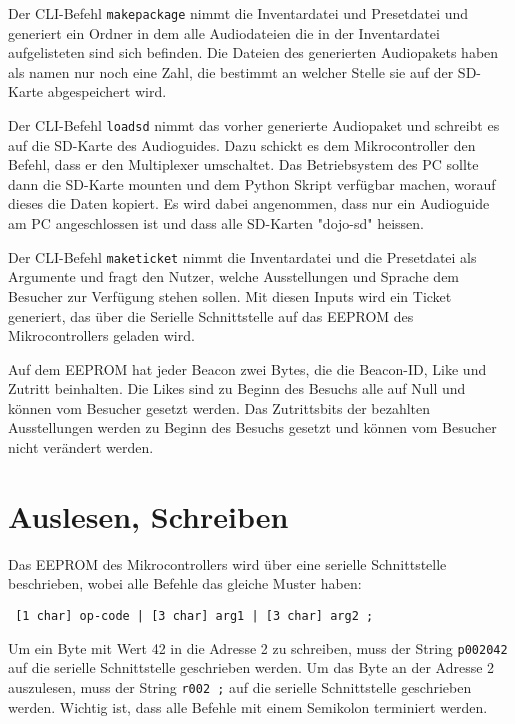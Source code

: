 Der CLI-Befehl \texttt{makepackage} nimmt die Inventardatei und Presetdatei und generiert ein Ordner in dem alle Audiodateien die in der Inventardatei aufgelisteten sind sich befinden.
Die Dateien des generierten Audiopakets haben als namen nur noch eine Zahl, die bestimmt an welcher Stelle sie auf der SD-Karte abgespeichert wird.

Der CLI-Befehl \texttt{loadsd} nimmt das vorher generierte Audiopaket und schreibt es auf die SD-Karte des Audioguides.
Dazu schickt es dem Mikrocontroller den Befehl, dass er den Multiplexer umschaltet.
Das Betriebsystem des PC sollte dann die SD-Karte mounten und dem Python Skript verfügbar machen, worauf dieses die Daten kopiert.
Es wird dabei angenommen, dass nur ein Audioguide am PC angeschlossen ist und dass alle SD-Karten "dojo-sd" heissen.

Der CLI-Befehl \texttt{maketicket} nimmt die Inventardatei und die Presetdatei als Argumente und fragt den Nutzer, welche Ausstellungen und Sprache dem Besucher zur Verfügung stehen sollen. 
Mit diesen Inputs wird ein Ticket generiert, das über die Serielle Schnittstelle auf das EEPROM des Mikrocontrollers geladen wird.

Auf dem EEPROM hat jeder Beacon zwei Bytes, die die Beacon-ID, Like und Zutritt beinhalten.
Die Likes sind zu Beginn des Besuchs alle auf Null und können vom Besucher gesetzt werden.
Das Zutrittsbits der bezahlten Ausstellungen werden zu Beginn des Besuchs gesetzt und können vom Besucher nicht verändert werden.


\section{Auslesen, Schreiben}
Das EEPROM des Mikrocontrollers wird über eine serielle Schnittstelle beschrieben, wobei alle Befehle das gleiche Muster haben:
\begin{verbatim} [1 char] op-code | [3 char] arg1 | [3 char] arg2 ; \end{verbatim}
Um ein Byte mit Wert 42 in die Adresse 2 zu schreiben, muss der String \texttt{p002042} auf die serielle Schnittstelle geschrieben werden.
Um das Byte an der Adresse 2 auszulesen, muss der String \texttt{r002   ;} auf die serielle Schnittstelle geschrieben werden.
Wichtig ist, dass alle Befehle mit einem Semikolon terminiert werden.

